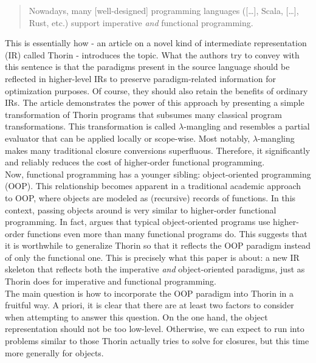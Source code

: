 \begin{quotation}
  Nowadays, many [well-designed] programming languages ([\ldots], Scala, [\ldots], Rust, etc.) support imperative \textit{and} functional programming.
\end{quotation}
This is essentially how \citet{7e4a991f} - an article on a novel kind of intermediate representation (IR) called Thorin - introduces the topic.
What the authors try to convey with this sentence is that the paradigms present in the source language should be reflected in higher-level IRs to preserve paradigm-related information for optimization purposes.
Of course, they should also retain the benefits of ordinary IRs.
The article demonstrates the power of this approach by presenting a simple transformation of Thorin programs that subsumes {\glqq}many classical program transformations{\grqq}.
This transformation is called $\lambda$-mangling and resembles a partial evaluator that can be applied locally or scope-wise.
Most notably, $\lambda$-mangling makes many traditional closure conversions superfluous. Therefore, it significantly and reliably reduces the cost of higher-order functional programming.
\\
Now, functional programming has a younger sibling: object-oriented programming (OOP).
This relationship becomes apparent in a traditional academic approach to OOP, where objects are modeled as (recursive) records of functions.
In this context, passing objects around is very similar to higher-order functional programming.
In fact, \citet{cook09understanding} argues that typical object-oriented programs use higher-order functions even more than many functional programs do.
This suggests that it is worthwhile to generalize Thorin so that it reflects the OOP paradigm instead of only the functional one.
This is precisely what this paper is about: a new IR skeleton that reflects both the imperative \textit{and} object-oriented paradigms, just as Thorin does for imperative and functional programming.
\\
The main question is how to incorporate the OOP paradigm into Thorin in a fruitful way.
A priori, it is clear that there are at least two factors to consider when attempting to answer this question.
On the one hand, the object representation should not be too low-level.
Otherwise, we can expect to run into problems similar to those Thorin actually tries to solve for closures, but this time more generally for objects.

